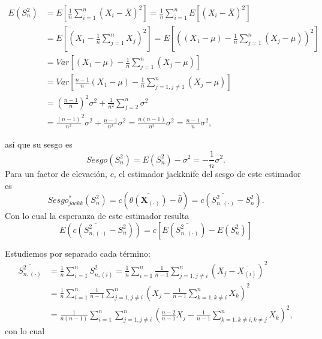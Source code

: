 \documentclass[]{book}
\theoremstyle{definition}
\theoremstyle{definition}
\theoremstyle{definition}
\theoremstyle{remark}
\begin{document}
\[\begin{aligned}
E\left( S_n^2 \right) &= E\left[ \frac{1}{n}\sum_{i=1}^{n}\left( X_i-
\bar{X} \right)^2\right] =\frac{1}{n}\sum_{i=1}^{n}E\left[ \left(
X_i-\bar{X} \right)^2\right] \\
&= E\left[ \left( X_1-\frac{1}{n}\sum_{j=1}^{n}X_j \right)^2\right] =E
\left[ \left( \left( X_1-\mu \right) -\frac{1}{n}\sum_{j=1}^{n}\left(
X_j-\mu \right) \right)^2\right] \\
&= Var\left[ \left( X_1-\mu \right) -\frac{1}{n}\sum_{j=1}^{n}\left(
X_j-\mu \right) \right] \\
&= Var\left[ \frac{n-1}{n}\left( X_1-\mu \right) -\frac{1}{n}
\sum_{j=1,j\neq 1}^{n}\left( X_j-\mu \right) \right] \\
&= \left( \frac{n-1}{n} \right)^2\sigma^2+\frac{1}{n^2}
\sum_{j=2}^{n}\sigma^2 \\
&= \frac{\left( n-1 \right)}{n^2}^2\sigma^2+\frac{n-1}{n^2}\sigma
^2=\frac{n\left( n-1 \right)}{n^2}\sigma^2=\frac{n-1}{n}\sigma^2,\end{aligned}\]

así que su sesgo es
\[Sesgo\left( S_n^2 \right) =E\left( S_n^2 \right) -\sigma^2=-\frac{1
}{n}\sigma^2.\]Para un factor de elevación, \(c\), el estimador
jackknife del sesgo de este estimador
es\[Sesgo_{jackk}^{\ast}\left( S_n^2 \right) =c\left( \overline{\theta
\left( \mathbf{X}_{(\cdot)} \right)}-\hat{\theta}
 \right) =c\left( \overline{S_{n,(\cdot)}^2}-S_n^2 \right)
.\]Con lo cual la esperanza de este estimador resulta
\[E\left( c\left( \overline{S_{n,(\cdot)}^2}-S_n^2 \right)
 \right) =c\left[ E\left( \overline{S_{n,(\cdot)}^2} \right)
-E\left( S_n^2 \right) \right]\]

Estudiemos por separado cada término: \[\begin{aligned}
\overline{S_{n,(\cdot)}^2} &= \frac{1}{n}\sum_{i=1}^{n}S_{n,
(i)}^2=\frac{1}{n}\sum_{i=1}^{n}\frac{1}{n-1}\sum_{j=1,j\neq
i}^{n}\left( X_j-\overline{X_{(i)}} \right)^2 \\
&= \frac{1}{n}\sum_{i=1}^{n}\frac{1}{n-1}\sum_{j=1,j\neq i}^{n}\left( X_j-
\frac{1}{n-1}\sum_{k=1,k\neq i}^{n}X_{k} \right)^2 \\
&= \frac{1}{n\left( n-1 \right)}\sum_{i=1}^{n}\sum_{j=1,j\neq i}^{n}\left( 
\frac{n-2}{n-1}X_j-\frac{1}{n-1}\sum_{k=1,k\neq i,k\neq j}^{n}X_{k} \right)^2,
\end{aligned}\] con lo cual
\end{document}
